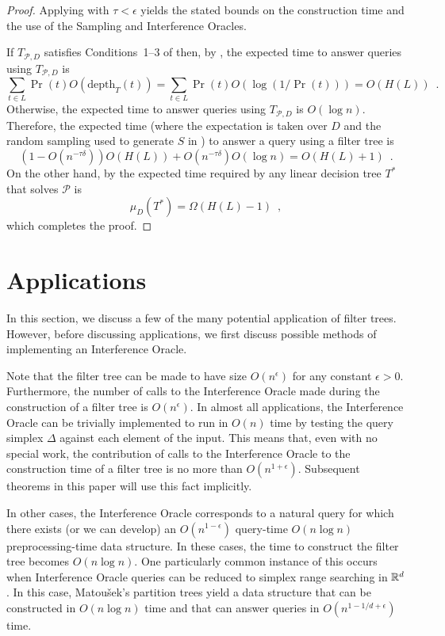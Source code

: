 \documentclass{patmorin}
\newcommand{\depth}{\mathrm{depth}}
\begin{document}
\begin{proof}
  Applying  with $\tau < \epsilon$
  yields the stated bounds on the construction time and the use of the
  Sampling and Interference Oracles.

  If $T_{\mathcal{P},D}$ satisfies Conditions~1--3 of 
   then, by ,
  the expected time to answer queries using $T_{\mathcal{P},D}$ is
  \[
     \sum_{t\in L} \Pr(t)O(\depth_T(t)) 
          = \sum_{t\in L}\Pr(t)O(\log(1/\Pr(t))) = O(H(L)) \enspace .
  \]
  Otherwise, the expected time to answer queries using $T_{\mathcal{P},D}$
  is $O(\log n)$.  Therefore, the expected time (where the expectation
  is taken over $D$ and the random sampling used to generate $S$ in
  ) to answer a query using a filter tree is
  \[
     (1-O(n^{-\tau\delta})) O(H(L)) + O(n^{-\tau\delta}) O(\log n) =
        O(H(L)+1)  \enspace .
  \]
  On the other hand, by  the expected time required
  by any linear decision tree $T^*$ that solves $\mathcal{P}$ is
  \[
      \mu_D(T^*) = \Omega(H(L) - 1) \enspace ,
  \]
  which completes the proof.
\end{proof}

\section{Applications}

In this section, we discuss a few of the many potential application of
filter trees.  However, before discussing applications, we first discuss
possible methods of implementing an Interference Oracle.

Note that the filter tree can be made to have size $O(n^\epsilon)$
for any constant $\epsilon > 0$.  Furthermore, the number of calls to
the Interference Oracle made during the construction of a filter tree
is $O(n^\epsilon)$.  In almost all applications, the Interference Oracle
can be trivially implemented to run in $O(n)$ time by testing the query
simplex $\Delta$ against each element of the input.  This means that,
even with no special work, the contribution of calls to the Interference
Oracle to the construction time of a filter tree is no more than
$O(n^{1+\epsilon})$.  Subsequent theorems in this paper will use this fact
implicitly.

In other cases, the Interference Oracle corresponds to a natural query
for which there exists (or we can develop) an $O(n^{1-\epsilon})$
query-time $O(n\log n)$ preprocessing-time data structure.  In these
cases, the time to construct the filter tree becomes $O(n\log n)$.
One particularly common instance of this occurs when Interference
Oracle queries can be reduced to simplex range searching in $\mathbb{R}^d$.
In this case, Matou\v{s}ek's partition trees yield a data structure that
can be constructed in $O(n\log n)$ time and that can answer queries in
$O(n^{1-1/d+\epsilon})$ time.
\end{document}
